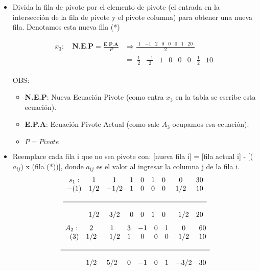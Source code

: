 \documentclass{templateNote}
\begin{document}
\begin{itemize}
    \item Divida la fila de pivote por el elemento de pivote (el entrada en la intersección de la fila de pivote y el pivote columna) para obtener una nueva fila. Denotamos esta nueva fila (*)
    \begin{center}
        \begin{align*}
        x_3: \quad \textbf{N.E.P} = \frac{\textbf{E.P.A}}{P} &\Rightarrow \frac{\begin{array}{cccccccc} 1 & -1 & 2 & 0 & 0 & 0 & 1 & 20\end{array}}{2} \\
        &= \begin{array}{cccccccc} \frac{1}{2} & \frac{-1}{2} & 1 & 0 & 0 & 0 & \frac{1}{2} & 10 \end{array}
        \end{align*}
    \end{center}
        OBS:
        \begin{itemize}
            \item \textbf{N.E.P}: Nueva Ecuación Pivote (como entra $x_3$ en la tabla se escribe esta ecuación).
            \item \textbf{E.P.A}: Ecuación Pivote Actual (como sale $A_3$ ocupamos esa ecuación).
            \item $P = Pivote$
        \end{itemize}
    \item Reemplace cada fila i que no sea pivote con: [nueva fila i] = [fila actual i] - [($a_{ij}$) x (fila (*))], donde  $a_{ij}$ es el valor al ingresar la columna j de la fila i.
    \begin{equation*}
        \begin{array}{cccccccccc}
            s_1: & 1 & 1 & 1 & 0 & 1 & 0 & 0 & 30 \\
            -(1) & 1/2 & -1/2 & 1 & 0 & 0 & 0 & 1/2 & 10 \\
            \\ \hline \\
            & 1/2 & 3/2 & 0 & 0 & 1 & 0 & -1/2 & 20
        \end{array}
    \end{equation*}
    \vspace{0.5cm}
    \begin{equation*}
        \begin{array}{ccccccccc}
            A_2: & 2 & 1 & 3 & -1 & 0 & 1 & 0 & 60 \\
            -(3) & 1/2 & -1/2 & 1 & 0 & 0 & 0 & 1/2 & 10 \\
            \\ \hline \\
            & 1/2 & 5/2 & 0 & -1 & 0 & 1 & -3/2 & 30
        \end{array}
    \end{equation*}
\end{itemize}
\end{document}
